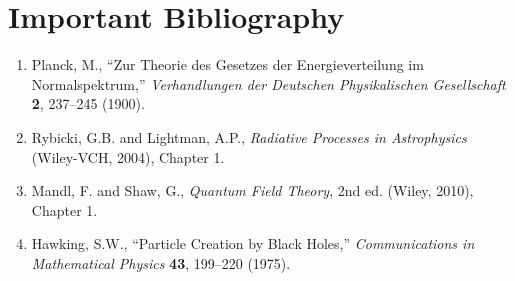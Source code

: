 \section*{Important Bibliography}

\begin{enumerate}
\item Planck, M., ``Zur Theorie des Gesetzes der Energieverteilung im Normalspektrum,'' \textit{Verhandlungen der Deutschen Physikalischen Gesellschaft} \textbf{2}, 237--245 (1900).
\item Rybicki, G.B. and Lightman, A.P., \textit{Radiative Processes in Astrophysics} (Wiley-VCH, 2004), Chapter 1.
\item Mandl, F. and Shaw, G., \textit{Quantum Field Theory}, 2nd ed. (Wiley, 2010), Chapter 1.
\item Hawking, S.W., ``Particle Creation by Black Holes,'' \textit{Communications in Mathematical Physics} \textbf{43}, 199--220 (1975).
\end{enumerate}

